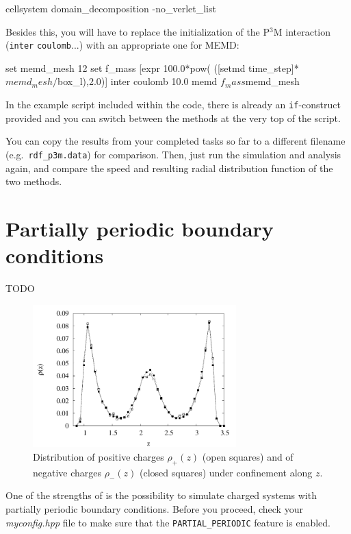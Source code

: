 \documentclass[
a4paper,                        %
11pt,                           %
twoside,                        %
footsepline,                    %
headsepline,                    %
headexclude,                    %
footexclude,                    %
pagesize,                       %
]{scrartcl}
\begin{document}
\begin{tclcode}
  cellsystem domain_decomposition -no_verlet_list
\end{tclcode}


Besides this, you will have to replace the initialization of the
P$^3$M interaction (\verb|inter| \verb|coulomb|...) with an
appropriate one for MEMD:

\begin{tclcode}
  set memd_mesh 12
  set f_mass [expr 100.0*pow( ([setmd time_step]*$memd_mesh/$box_l),2.0)]
  inter coulomb 10.0 memd $f_mass $memd_mesh
\end{tclcode}


In the example script included
within the \es{} code, there is already an \verb|if|-construct 
provided and you can switch between the methods at the very top
of the script.

You can copy the results from your completed tasks so far to a different
filename (e.g.~\verb|rdf_p3m.data|) for comparison. Then, just
run the simulation and analysis again, and compare the speed and 
resulting radial distribution function of the two methods.
\fi

\section{Partially periodic boundary conditions}

TODO
\iffalse
\begin{figure}[h]
  \centering
  \includegraphics[width=0.7\textwidth]{figures/neutral-rho}
  \caption{Distribution of positive charges $\rho_+(z)$ (open squares)
    and of negative charges $\rho_-(z)$ (closed squares) under
    confinement along $z$.}
  \label{fig:neutralrho}
\end{figure}

One of the strengths of \es{} is the possibility to simulate charged
systems with partially periodic boundary conditions.
Before you proceed, check your \emph{myconfig.hpp} file to make
sure that the \verb|PARTIAL_PERIODIC| feature is enabled.
\end{document}
